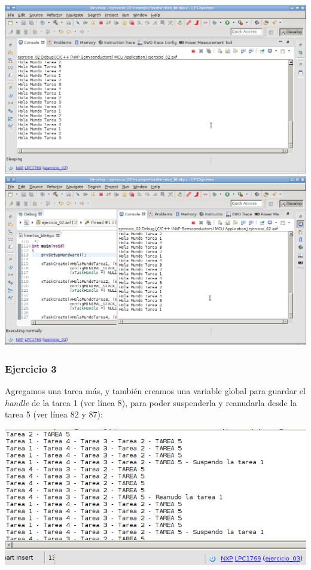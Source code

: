 \vspace{0.2cm}
\includegraphics[scale=0.34]{images/tp_3}
\vspace{0.2cm}
\includegraphics[scale=0.4]{images/tp_3_2}
\vspace{0.5cm}

\subsubsection*{Ejercicio 3}
Agregamos una tarea más, y también creamos una variable global para guardar el \emph{handle} de la tarea 1 (ver línea 8), para poder suspenderla y reanudarla desde la tarea 5 (ver línea 82 y 87):


\includegraphics[scale=0.4]{images/tp_3_ej3}
\vspace{0.2cm}


